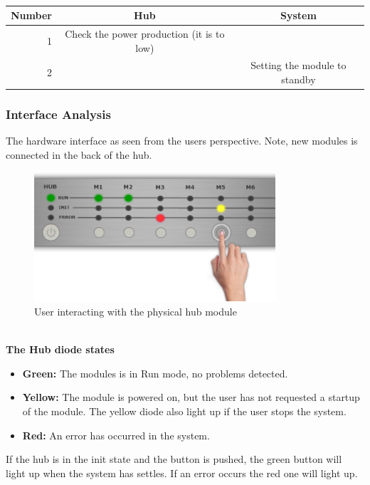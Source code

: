 		\\\begin{table}[h!]
					\begin{tabular}{| r | c | c |}
					\hline
					Number	& Hub				& System \\ \hline
					1		& Check the power production (it is to low)	& ~ \\ \hline
					2		& ~											& Setting the module to standby \\ \hline
					\end{tabular}
				\end{table}
	\newpage	
	\subsubsection{Interface Analysis}
	The hardware interface as seen from the users perspective. Note, new modules is connected in the back of the hub.
		\begin{figure}[h!]		%
			\begin{centering}
				 \includegraphics[width=0.8\textwidth]{images/hub_user_interact.png}
				\caption{User interacting with the physical hub module}
		 	\end{centering}
		\end{figure}
		\\ \textbf{The Hub diode states}
		\begin{itemize}
			\item \textbf{Green: }The modules is in Run mode, no problems detected.
			\item \textbf{Yellow: }The module is powered on, but the user has not requested a startup of the module.
							The yellow diode also light up if the user stops the system.
			\item \textbf{Red: }An error has occurred in the system.
		\end{itemize}
		If the hub is in the init state and the button is pushed, the green button will light up when the system has settles. If an error occurs the red one will light up.
